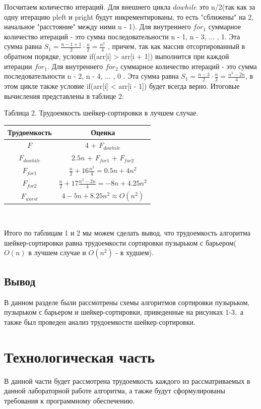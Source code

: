 \documentclass[a4paper, 14pt]{article}
\begin{document}
		Посчитаем количество итераций. Для внешнего цикла $do while$ это n/2(так как за одну итерацию pleft и pright будут инкрементированы, то есть "сближены" на 2, начальное "расстояние" между ними n - 1). Для внутреннего $for_{1}$ суммарное количество итераций - это сумма последовательности n - 1, n - 3, ... , 1. Эта сумма равна $S_{1} = \frac{n - 1 + 1}{2}\cdot \frac{n}{2} = \frac{n^2}{4}$ , причем, так как массив отсортированный в обратном порядке, условие if(arr[i] > arr[i + 1]) выполнится при каждой итерации $for_{1}$.  Для внутреннего $for_{2}$ суммарное количество итераций - это сумма последовательности n - 2, n - 4, ... , 0 . Эта сумма равна $S_{1} = \frac{n - 2}{2}\cdot \frac{n}{2} = \frac{n^2 - 2n}{4}$, в этом цикле также условие if(arr[i] < arr[i - 1]) будет всегда верно. Итоговые вычисления представлены в таблице 2:\\
        	\begin{center}
  	Таблица 2. Трудоемкость шейкер-сортировки в лучшем случае.\\
  		
		\begin{tabular}{ | c | c | }
        \hline
		Трудоемкость & Оценка\\ \hline
		$F$ & 4 + $F_{dowhile}$\\ \hline
		$F_{dowhile}$ & $2.5n$ + $F_{for1}$ + $F_{for2}$\\ \hline
		$F_{for1}$ & $\frac{n}{2} + 16\frac{n^2}{4} = 0.5n + 4n^2$\\ \hline
		$F_{for2}$ & $\frac{n}{2} + 17\frac{n^2 - 2n}{4} = -8n + 4.25n^2$\\ \hline
		\textbf{$F_{worst}$} & \textbf{$4 - 5n + 8.25n^2 \approx O(n^2)$}\\ \hline
		\hline
        \end{tabular}\\
        \end{center}
        Итого по таблицам 1 и 2 мы можем сделать вывод, что трудоемкость алгоритма шейкер-сортировки равна трудоемкости сортировки пузырьком с барьером($O(n)$ в лучшем случае и $O(n^2)$ - в худшем).
		\subsection{Вывод}
		В данном разделе были рассмотрены схемы алгоритмов сортировки пузырьком, пузырьком с барьером и шейкер-сортировки, приведенные на рисунках 1-3,\ а также был проведен анализ трудоемкости шейкер-сортировки. 
		
		\newpage
		\section{Технологическая часть}
		В данной части будет рассмотрена трудоемкость каждого из рассматриваемых в данной лабораторной работе алгоритма, а также будут сформулированы требования к программному обеспечению.
\end{document}
